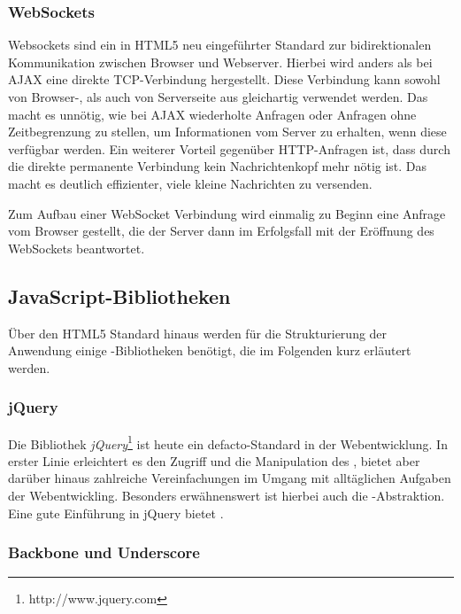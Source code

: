\subsubsection{WebSockets}

Websockets sind ein in HTML5 neu eingeführter Standard zur bidirektionalen  Kommunikation zwischen
Browser und Webserver. Hierbei wird anders als bei  AJAX eine direkte TCP-Verbindung hergestellt.
Diese Verbindung kann sowohl von  Browser-, als auch von Serverseite aus gleichartig verwendet
werden. Das macht es  unnötig, wie bei AJAX wiederholte Anfragen oder Anfragen ohne Zeitbegrenzung
zu  stellen, um Informationen vom Server zu erhalten, wenn diese verfügbar werden. Ein weiterer
Vorteil gegenüber HTTP-Anfragen ist, dass durch die direkte permanente Verbindung kein
Nachrichtenkopf mehr nötig ist. Das macht es deutlich  effizienter, viele kleine Nachrichten zu
versenden.

Zum Aufbau einer WebSocket Verbindung wird einmalig zu Beginn eine  Anfrage vom Browser
gestellt, die der Server dann im Erfolgsfall mit der Eröffnung des WebSockets beantwortet.
\cite{websockets}

\clearpage

\subsection{JavaScript-Bibliotheken}

Über den HTML5 Standard hinaus werden für die Strukturierung der Anwendung einige
-Bibliotheken benötigt, die im Folgenden kurz erläutert werden.

\subsubsection{jQuery}

Die Bibliothek \textit{jQuery}\footnote{http://www.jquery.com} ist heute ein defacto-Standard in der
Webentwicklung. In erster Linie erleichtert es den Zugriff und die Manipulation des ,
bietet aber darüber hinaus zahlreiche Vereinfachungen im Umgang mit alltäglichen Aufgaben der
Webentwickling. Besonders erwähnenswert ist hierbei auch die -Abstraktion. Eine gute
Einführung in jQuery bietet \cite{jquery}.

\subsubsection{Backbone und Underscore}

